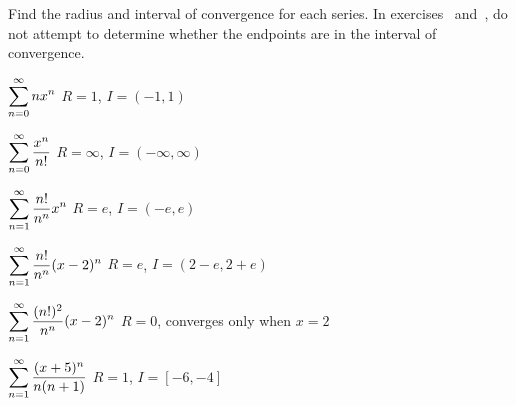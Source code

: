 \exercises

Find the radius and interval of convergence for each series.  In
exercises~ and~,
do not attempt to determine whether the endpoints are in the
interval of convergence.

\twocol

\exercise $\displaystyle\sum_{n=0}^\infty n x^n$
\answer $R=1$, $I=(-1,1)$
\endanswer
\endexercise

\exercise $\displaystyle\sum_{n=0}^\infty {x^n\over n!}$
\answer $R=\infty$, $I=(-\infty,\infty)$
\endanswer
\endexercise

\exercise 
\relax{}
$\displaystyle\sum_{n=1}^\infty {n!\over n^n}x^n$
\answer $R=e$, $I=(-e,e)$
\endanswer
\endexercise

\exercise 
\relax{}
$\displaystyle\sum_{n=1}^\infty {n!\over n^n}(x-2)^n$
\answer $R=e$, $I=(2-e,2+e)$
\endanswer
\endexercise

\exercise $\displaystyle\sum_{n=1}^\infty {(n!)^2\over n^n}(x-2)^n$
\answer $R=0$, converges only when $x=2$
\endanswer
\endexercise

\exercise $\displaystyle\sum_{n=1}^\infty {(x+5)^n\over n(n+1)}$
\answer $R=1$, $I=[-6,-4]$
\endanswer

\endtwocol
\endexercise

\endexercises

